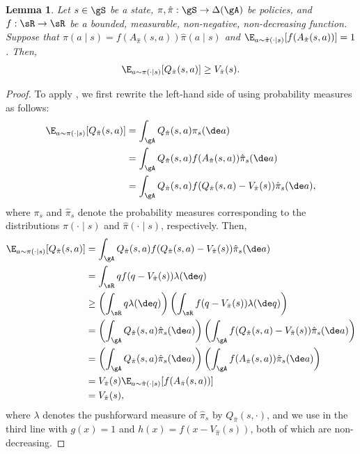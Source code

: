 \documentclass{article}
\newtheorem{lemma}{Lemma}
\begin{document}
\begin{lemma} \label{lem:imp_lemma}
Let $s \in \gS$ be a state, $\pi, \hat \pi: \gS \to \Delta(\gA)$ be policies, and $f: \sR \to \sR$ be a bounded, measurable, non-negative, non-decreasing function.
Suppose that $\pi(a \mid s) = f(A_{\hat{\pi}} (s, a)) \hat \pi(a \mid s)$ and $\E_{a \sim \hat \pi(\cdot \mid s)}[f(A_{\hat \pi}(s, a))] = 1$.
Then,
\begin{align}
    \E_{a \sim \pi(\cdot \mid s)}[Q_{\hat \pi}(s, a)] \geq V_{\hat \pi}(s). \label{eq:imp_lemma}
\end{align}
\end{lemma}
\begin{proof}
To apply , we first rewrite the left-hand side of  using probability measures as follows:
\begin{align}
    \E_{a \sim \pi(\cdot \mid s)}[Q_{\hat \pi}(s, a)]
    &= \int_\gA Q_{\hat{\pi}}(s, a) \pi_s(\de a) \\
    &= \int_\gA Q_{\hat{\pi}}(s, a) f(A_{\hat{\pi}}(s, a)) \hat \pi_s(\de a) \\
    &= \int_\gA Q_{\hat{\pi}}(s, a) f(Q_{\hat{\pi}}(s, a) - V_{\hat{\pi}}(s)) \hat \pi_s(\de a),
\end{align}
where $\pi_s$ and $\hat \pi_s$ denote the probability measures corresponding to
the distributions $\pi(\cdot \mid s)$ and $\hat \pi(\cdot \mid s)$, respectively.
Then,
\begin{align}
    \E_{a \sim \pi(\cdot \mid s)}[Q_{\hat \pi}(s, a)]
    &= \int_\gA Q_{\hat{\pi}}(s, a) f(Q_{\hat{\pi}}(s, a) - V_{\hat{\pi}}(s)) \hat \pi_s(\de a)  \\
    &= \int_\sR q f(q - V_{\hat \pi}(s)) \lambda(\de q) \\
    &\geq \left( \int_\sR q \lambda(\de q) \right) \left( \int_\sR f(q - V_{\hat{\pi}}(s)) \lambda(\de q) \right) \\
    &= \left( \int_\gA Q_{\hat{\pi}}(s, a) \hat \pi_s(\de a) \right) \left( \int_\gA f(Q_{\hat{\pi}}(s, a) - V_{\hat{\pi}}(s)) \hat \pi_s(\de a) \right) \\
    &= \left( \int_\gA Q_{\hat{\pi}}(s, a) \hat \pi_s(\de a) \right) \left( \int_\gA f(A_{\hat{\pi}}(s, a)) \hat \pi_s(\de a) \right) \\
    &= V_{\hat{\pi}}(s) \E_{a \sim \hat \pi(\cdot \mid s)}[f(A_{\hat \pi}(s, a))] \\
    &= V_{\hat{\pi}}(s),
\end{align}
where $\lambda$ denotes the pushforward measure of $\hat \pi_s$ by $Q_{\hat{\pi}}(s, \cdot)$,
and we use  in the third line
with $g(x) = 1$ and $h(x) = f(x - V_{\hat{\pi}}(s))$,
both of which are non-decreasing.
\end{proof}
\end{document}
